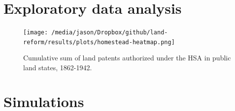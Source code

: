 \documentclass[12pt]{article}
\begin{document}
\begin{singlespacing}
\maketitle \thispagestyle{empty}
\tableofcontents \thispagestyle{empty}
\end{singlespacing}


\pagebreak
{}%

\section{Exploratory data analysis} \label{eda}

\begin{figure}[htbp]
	\begin{center}
		\texttt{[image: /media/jason/Dropbox/github/land-reform/results/plots/homestead-heatmap.png]}
	\end{center}
	\caption{Cumulative sum of land patents authorized under the HSA in public land states, 1862-1942. \label{fig:homestead-heatmap}}
\end{figure}

\pagebreak
\section{Simulations} \label{sims-sm}
\end{document}
